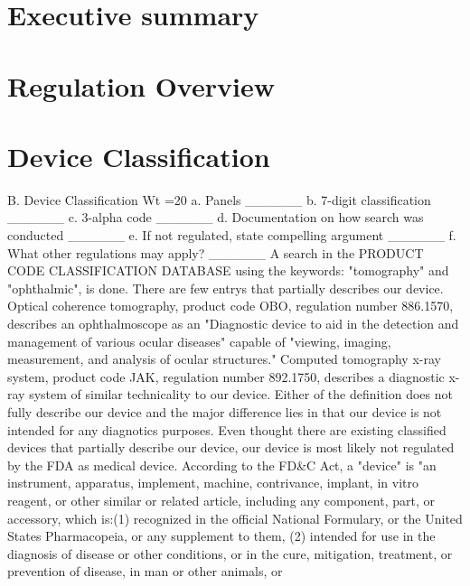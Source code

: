 \documentclass{article}
\begin{document}

\setcounter{tocdepth}{3}
\tableofcontents
\newpage

\section*{Executive summary}
\label{sec:exec-summary}

\section{Regulation Overview}
\label{sec:test-administration}

\section{Device Classification}
\label{sec:protocols}
B. Device Classification Wt =20%
a. Panels ______
b. 7-digit classification ______
c. 3-alpha code ______
d. Documentation on how search was conducted ______
e. If not regulated, state compelling argument ______
f. What other regulations may apply? ______
A search in the PRODUCT CODE CLASSIFICATION DATABASE using the keywords: "tomography" and "ophthalmic", is done. There are few entrys that partially describes our device. Optical coherence tomography, product code OBO, regulation number 886.1570, describes an ophthalmoscope as an "Diagnostic device to aid in the detection and management of various ocular diseases" capable of "viewing, imaging, measurement, and analysis of ocular structures."  Computed tomography x-ray system, product code JAK, regulation number 892.1750, describes a diagnostic x-ray system of similar technicality to our device. Either of the definition does not fully describe our device and the major difference lies in that our device is not intended for any diagnotics purposes.
Even thought there are existing classified devices that partially describe our device, our device is most likely not regulated by the FDA as medical device. According to the FD&C Act, a "device" is "an instrument, apparatus, implement, machine, contrivance, implant, in vitro reagent, or other similar or related article, including any component, part, or accessory, which is:(1) recognized in the official National Formulary, or the United States Pharmacopeia, or any supplement to them,
(2) intended for use in the diagnosis of disease or other conditions, or in the cure, mitigation, treatment, or prevention of disease, in man or other animals, or
\end{document}
